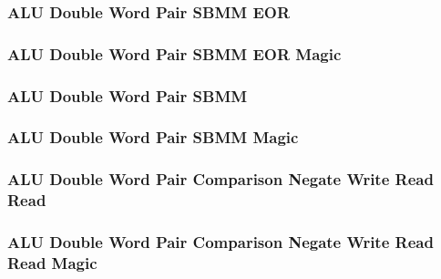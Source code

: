 \subsubsection[{\small ALU Double Word Pair SBMM EOR}]{ALU Double Word Pair SBMM EOR} \label{sec:format-ALU-DPSBMME}



\subsubsection[{\small ALU Double Word Pair SBMM EOR Magic}]{ALU Double Word Pair SBMM EOR Magic} \label{sec:format-ALU-DPSBMME.M}



\subsubsection[{\small ALU Double Word Pair SBMM}]{ALU Double Word Pair SBMM} \label{sec:format-ALU-DPSBMM}



\subsubsection[{\small ALU Double Word Pair SBMM Magic}]{ALU Double Word Pair SBMM Magic} \label{sec:format-ALU-DPSBMM.M}



\subsubsection[{\small ALU Double Word Pair Comparison Negate Write Read Read}]{ALU Double Word Pair Comparison Negate Write Read Read} \label{sec:format-ALU-DPCNWRR}



\subsubsection[{\small ALU Double Word Pair Comparison Negate Write Read Read Magic}]{ALU Double Word Pair Comparison Negate Write Read Read Magic} \label{sec:format-ALU-DPCNWRR.M}

